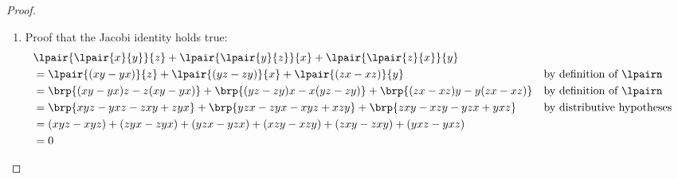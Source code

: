 \begin{proof}
\begin{enumerate}
  \item Proof that the Jacobi identity holds true:
    \begin{align*}
      &\lpair{\lpair{x}{y}}{z} + \lpair{\lpair{y}{z}}{x} + \lpair{\lpair{z}{x}}{y}
      \\&= \lpair{(xy-yx)}{z} + \lpair{(yz-zy)}{x} + \lpair{(zx-xz)}{y}
        && \text{by definition of $\lpairn$}
      \\&= \brp{(xy-yx)z-z(xy-yx)} + \brp{(yz-zy)x-x(yz-zy)} + \brp{(zx-xz)y-y(zx-xz)}
        && \text{by definition of $\lpairn$}
      \\&= \brp{xyz-yxz-zxy+zyx} + \brp{yzx-zyx-xyz+xzy} + \brp{zxy-xzy-yzx+yxz}
        && \text{by distributive hypotheses}
      \\&= (xyz-xyz)+(zyx-zyx) + (yzx-yzx)+(xzy-xzy) + (zxy-zxy)+(yxz-yxz)
      \\&= 0
    \end{align*}
  \end{enumerate}

\end{proof}



